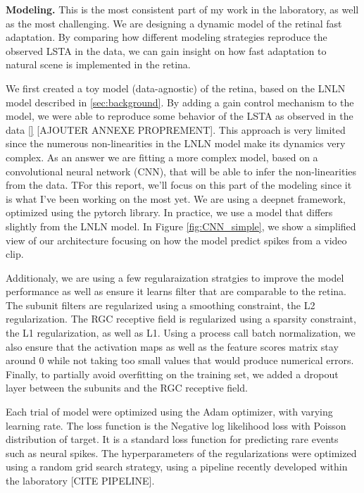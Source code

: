 
\textbf{Modeling.} This is the most consistent part of my work in the
laboratory, as well as the
most challenging. We are designing a dynamic model of the retinal fast
adaptation.
By comparing how different modeling strategies reproduce the
observed LSTA in the data, we can gain insight on how fast adaptation to
natural scene is implemented in the retina.

We first created a toy model (data-agnostic) of the retina, based on the LNLN
model described
in \ref{sec:background}. By adding a gain control mechanism to the model, we
were able to reproduce some behavior of the LSTA as observed in the data \ref{}
[AJOUTER ANNEXE PROPREMENT].
This approach is very limited since the numerous non-linearities in the LNLN
model make its dynamics very complex.
As an answer we are fitting a more complex model, based on a convolutional
neural network (CNN), that will be able to infer the non-linearities from the
data. TFor this report, we'll focus on this part of the modeling since it is
what I've been working on the most yet.
We are using a deepnet framework, optimized using the
pytorch library. In practice, we use a model that differs slightly from the
LNLN
model. In Figure \ref*{fig:CNN_simple}, we show a simplified view of our
architecture focusing on how the model predict spikes from a video clip.

Additionaly, we are using a few regularaization stratgies to improve the model
performance as well as ensure it learns filter that are comparable to the
retina. %
The subunit filters are regularized using a smoothing constraint, the L2
regularization. The RGC receptive field is regularized using a sparsity
constraint, the L1 regularization, as well as L1. Using a process call batch
normalization, we also ensure that the activation maps as well as the feature
scores matrix stay around 0 while not taking too small values that would
produce numerical errors. Finally, to partially avoid overfitting on the
training set, we added a dropout layer between the subunits and the RGC
receptive field.

Each trial of model were optimized using the Adam optimizer, with varying
learning rate. The loss function is the Negative log likelihood loss with
Poisson distribution of target. It is a standard loss function for predicting
rare events such as neural spikes.
The hyperparameters of the regularizations were optimized using a random grid
search strategy, using a pipeline recently developed within the laboratory
    [CITE PIPELINE]. %


